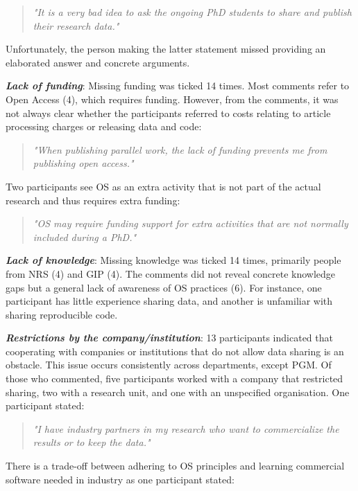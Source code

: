 \documentclass[gc, manuscript]{copernicus}
\begin{document}
\begin{quote}
\textit{"It is a very bad idea to ask the ongoing PhD students to share and publish their research data."}
\end{quote}

Unfortunately, the person making the latter statement missed providing
an elaborated answer and concrete arguments.

\textit{\textbf{Lack of funding}}: Missing funding was ticked 14 times.
Most comments refer to Open Access (4), which requires funding. However,
from the comments, it was not always clear whether the participants
referred to costs relating to article processing charges or releasing
data and code:

\begin{quote}
\textit{"When publishing parallel work, the lack of funding prevents me from publishing open access."}
\end{quote}

Two participants see OS as an extra activity that is not part of the
actual research and thus requires extra funding:

\begin{quote}
\textit{"OS may require funding support for extra activities that are not normally included during a PhD."}
\end{quote}

\textit{\textbf{Lack of knowledge}}: Missing knowledge was ticked 14
times, primarily people from NRS (4) and GIP (4). The comments did not
reveal concrete knowledge gaps but a general lack of awareness of OS
practices (6). For instance, one participant has little experience
sharing data, and another is unfamiliar with sharing reproducible code.

\textit{\textbf{Restrictions by the company/institution}}: 13
participants indicated that cooperating with companies or institutions
that do not allow data sharing is an obstacle. This issue occurs
consistently across departments, except PGM. Of those who commented,
five participants worked with a company that restricted sharing, two
with a research unit, and one with an unspecified organisation. One
participant stated:

\begin{quote}
\textit{"I have industry partners in my research who want to commercialize the results or to keep the data."}
\end{quote}

There is a trade-off between adhering to OS principles and learning
commercial software needed in industry as one participant stated:
\end{document}
